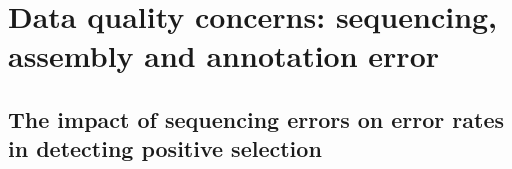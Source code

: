 
\section{Data quality concerns: sequencing, assembly and annotation error}

\subsection{The impact of sequencing errors on error rates in detecting positive selection}
\label{sec_error_impact}

